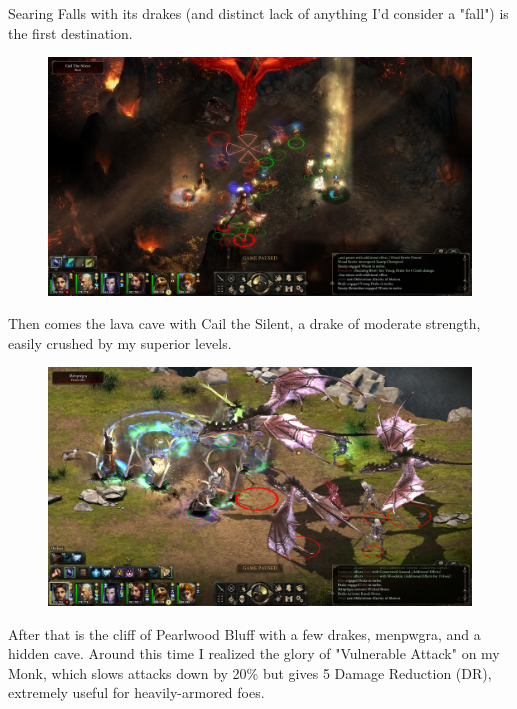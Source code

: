 \documentclass{article}
\begin{document}
Searing Falls with its drakes (and distinct lack of anything I'd consider a "fall") is the first destination.

\begin{figure}
\includegraphics[scale=0.33]{files/blog/2018_11_25_pillars_of_eternity_path_of_the_damned_act_ii/2018_11_25_cailthesilent.jpg}
\end{figure}

Then comes the lava cave with Cail the Silent, a drake of moderate strength, easily crushed by my superior levels.

\begin{figure}
\includegraphics[scale=0.33]{files/blog/2018_11_25_pillars_of_eternity_path_of_the_damned_act_ii/2018_11_25_pearlwoodbluff.jpg}
\end{figure}

After that is the cliff of Pearlwood Bluff with a few drakes, menpwgra, and a hidden cave.  Around this time I realized the glory of "Vulnerable Attack" on my Monk, which slows attacks down by 20\% but gives 5 Damage Reduction (DR), extremely useful for heavily-armored foes.
\end{document}
